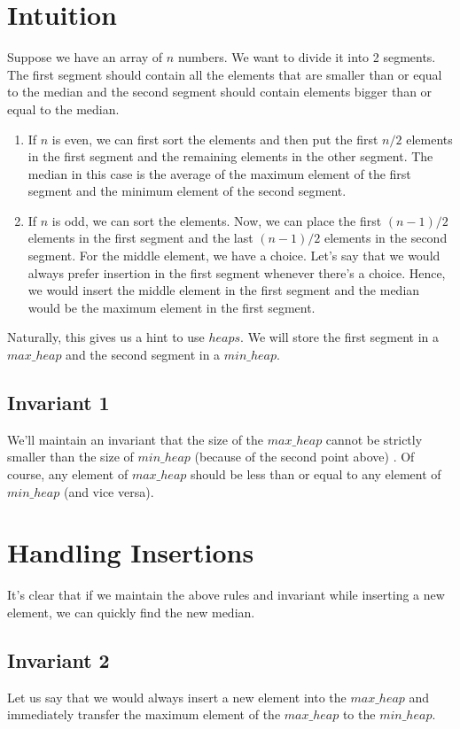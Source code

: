 \documentclass[12pt]{article}
\begin{document}
\section*{Intuition}
Suppose we have an array of $n$ numbers. We want to divide it into 2 segments. The first segment should contain all the elements that are smaller than or equal to the median and the second segment should contain elements bigger than or equal to the median.  

\begin{enumerate}
    \item If $n$ is even, we can first sort the elements and then put the first $n/2$ elements in the first segment and the remaining elements in the other segment. The median in this case is the average of the maximum element of the first segment and the minimum element of the second segment.  
    
    \item If $n$ is odd, we can sort the elements. Now, we can place the first $(n-1)/2$ elements in the first segment and the last $(n-1)/2$ elements in the second segment. For the middle element, we have a choice. Let's say that we would always prefer insertion in the first segment whenever there's a choice. Hence, we would insert the middle element in the first segment and the median would be the maximum element in the first segment.
\end{enumerate}

\noindent
Naturally, this gives us a hint to use $heaps$. We will store the first segment in a $max\_heap$ and the second segment in a $min\_heap$.

\subsection*{Invariant 1}
We'll maintain an invariant that the size of the $max\_heap$ cannot be strictly smaller than the size of $min\_heap$ (because of the second point above) . Of course, any element of $max\_heap$ should be less than or equal to any element of $min\_heap$ (and vice versa).

\section*{Handling Insertions}
It's clear that if we maintain the above rules and invariant while inserting a new element, we can quickly find the new median. 


\subsection*{Invariant 2}
Let us say that we would always insert a new element into the $max\_heap$ and immediately transfer the maximum element of the $max\_heap$ to the $min\_heap$.
\end{document}

